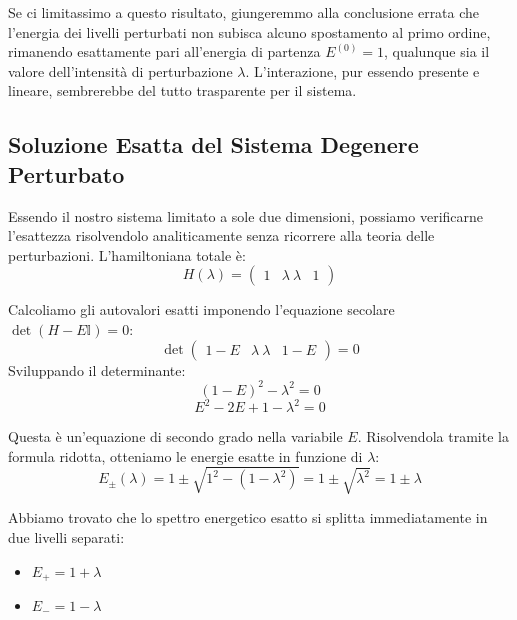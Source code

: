 Se ci limitassimo a questo risultato, giungeremmo alla conclusione errata che l'energia dei livelli perturbati non subisca alcuno spostamento al primo ordine, rimanendo esattamente pari all'energia di partenza $E^{(0)}=1$, qualunque sia il valore dell'intensità di perturbazione $\lambda$. L'interazione, pur essendo presente e lineare, sembrerebbe del tutto trasparente per il sistema.

\subsection{Soluzione Esatta del Sistema Degenere Perturbato}
Essendo il nostro sistema limitato a sole due dimensioni, possiamo verificarne l'esattezza risolvendolo analiticamente senza ricorrere alla teoria delle perturbazioni.
L'hamiltoniana totale è:
\begin{equation}
H(\lambda) = \begin{pmatrix} 1 & \lambda \ \lambda & 1 \end{pmatrix}
\end{equation}

Calcoliamo gli autovalori esatti imponendo l'equazione secolare $\det(H - E\mathbb{I}) = 0$:
\begin{equation}
\det \begin{pmatrix} 1 - E & \lambda \ \lambda & 1 - E \end{pmatrix} = 0
\end{equation}
Sviluppando il determinante:
\begin{equation}
(1 - E)^2 - \lambda^2 = 0
\end{equation}
\begin{equation}
E^2 - 2E + 1 - \lambda^2 = 0
\end{equation}

Questa è un'equazione di secondo grado nella variabile $E$. Risolvendola tramite la formula ridotta, otteniamo le energie esatte in funzione di $\lambda$:
\begin{equation}
E_{\pm}(\lambda) = 1 \pm \sqrt{1^2 - (1 - \lambda^2)} = 1 \pm \sqrt{\lambda^2} = 1 \pm \lambda
\end{equation}

Abbiamo trovato che lo spettro energetico esatto si splitta immediatamente in due livelli separati:
\begin{itemize}
\item $E_+ = 1 + \lambda$
\item $E_- = 1 - \lambda$
\end{itemize}

